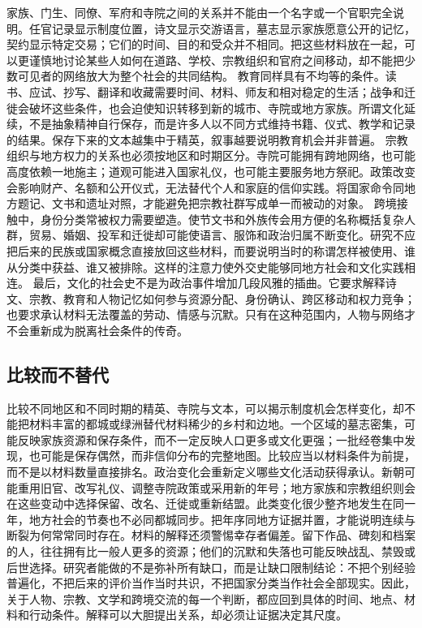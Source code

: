 家族、门生、同僚、军府和寺院之间的关系并不能由一个名字或一个官职完全说明。任官记录显示制度位置，诗文显示交游语言，墓志显示家族愿意公开的记忆，契约显示特定交易；它们的时间、目的和受众并不相同。把这些材料放在一起，可以更谨慎地讨论某些人如何在道路、学校、宗教组织和官府之间移动，却不能把少数可见者的网络放大为整个社会的共同结构。  教育同样具有不均等的条件。读书、应试、抄写、翻译和收藏需要时间、材料、师友和相对稳定的生活；战争和迁徙会破坏这些条件，也会迫使知识转移到新的城市、寺院或地方家族。所谓文化延续，不是抽象精神自行保存，而是许多人以不同方式维持书籍、仪式、教学和记录的结果。保存下来的文本越集中于精英，叙事越要说明教育机会并非普遍。  宗教组织与地方权力的关系也必须按地区和时期区分。寺院可能拥有跨地网络，也可能高度依赖一地施主；道观可能进入国家礼仪，也可能主要服务地方祭祀。政策改变会影响财产、名额和公开仪式，无法替代个人和家庭的信仰实践。将国家命令同地方题记、文书和遗址对照，才能避免把宗教社群写成单一而被动的对象。  跨境接触中，身份分类常被权力需要塑造。使节文书和外族传会用方便的名称概括复杂人群，贸易、婚姻、投军和迁徙却可能使语言、服饰和政治归属不断变化。研究不应把后来的民族或国家概念直接放回这些材料，而要说明当时的称谓怎样被使用、谁从分类中获益、谁又被排除。这样的注意力使外交史能够同地方社会和文化实践相连。  最后，文化的社会史不是为政治事件增加几段风雅的插曲。它要求解释诗文、宗教、教育和人物记忆如何参与资源分配、身份确认、跨区移动和权力竞争；也要求承认材料无法覆盖的劳动、情感与沉默。只有在这种范围内，人物与网络才不会重新成为脱离社会条件的传奇。 \subsection{比较而不替代} 比较不同地区和不同时期的精英、寺院与文本，可以揭示制度机会怎样变化，却不能把材料丰富的都城或绿洲替代材料稀少的乡村和边地。一个区域的墓志密集，可能反映家族资源和保存条件，而不一定反映人口更多或文化更强；一批经卷集中发现，也可能是保存偶然，而非信仰分布的完整地图。比较应当以材料条件为前提，而不是以材料数量直接排名。政治变化会重新定义哪些文化活动获得承认。新朝可能重用旧官、改写礼仪、调整寺院政策或采用新的年号；地方家族和宗教组织则会在这些变动中选择保留、改名、迁徙或重新结盟。此类变化很少整齐地发生在同一年，地方社会的节奏也不必同都城同步。把年序同地方证据并置，才能说明连续与断裂为何常常同时存在。材料的解释还须警惕幸存者偏差。留下作品、碑刻和档案的人，往往拥有比一般人更多的资源；他们的沉默和失落也可能反映战乱、禁毁或后世选择。研究者能做的不是弥补所有缺口，而是让缺口限制结论：不把个别经验普遍化，不把后来的评价当作当时共识，不把国家分类当作社会全部现实。因此，关于人物、宗教、文学和跨境交流的每一个判断，都应回到具体的时间、地点、材料和行动条件。解释可以大胆提出关系，却必须让证据决定其尺度。